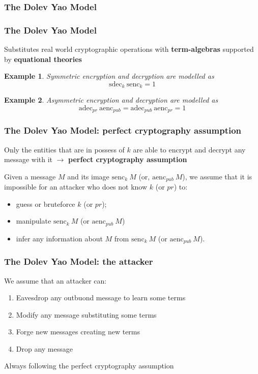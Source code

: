 \documentclass[aspectratio=169,t,xcolor=table]{beamer}
\newtheorem{ex}{Example}
\begin{document}
\begin{frame}{}
    \frametitle{The Dolev Yao Model}
\end{frame}

\begin{frame}
    \frametitle{The Dolev Yao Model}

    Substitutes real world cryptographic operations with \textbf{term-algebras} supported by \textbf{equational theories}
    \begin{ex}
        Symmetric encryption and decryption are modelled as
        $$\textrm{sdec}_k\ \textrm{senc}_k = 1$$
    \end{ex}

    \begin{ex}
        Asymmetric encryption and decryption are modelled as
        $$\textrm{adec}_{pr}\ \textrm{aenc}_{pub} = \textrm{adec}_{pub}\ \textrm{aenc}_{pr} = 1$$
    \end{ex}
\end{frame}

\begin{frame}
    \frametitle{The Dolev Yao Model: perfect cryptography assumption}

    Only the entities that are in possess of $k$ are able to encrypt and decrypt any message with it $\to$ \textbf{perfect cryptography assumption}

    Given a message $M$ and its image $\textrm{senc}_k\ M$ (or, $\textrm{aenc}_{pub}\ M$), we assume that it is impossible for an attacker who does not know $k$ (or $pr$) to:

    \begin{itemize}
        \item guess or bruteforce $k$ (or $pr$);
        \item manipulate $\textrm{senc}_k\ M$ (or $\textrm{aenc}_{pub}\ M$)
        \item infer any information about $M$ from $\textrm{senc}_k\ M$ (or $\textrm{aenc}_{pub}\ M$).
    \end{itemize}    
\end{frame}

\begin{frame}
    \frametitle{The Dolev Yao Model: the attacker}

    We assume that an attacker can:

    \begin{enumerate}
        \item Eavesdrop any outbuond message to learn some terms
        \item Modify any message substituting some terms
        \item Forge new messages creating new terms
        \item Drop any message
    \end{enumerate}

    Always following the perfect cryptography assumption
\end{frame}
\end{document}
